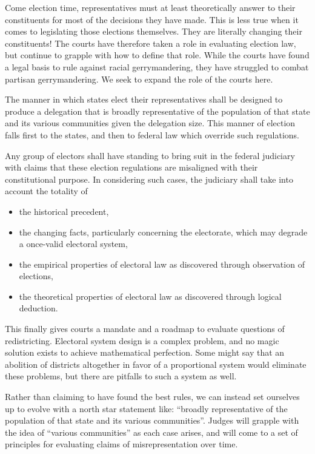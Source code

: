 \documentclass{article}
\newcommand{\quotes}[1]{``#1''}
\begin{document}
Come election time, representatives must at least theoretically answer to their constituents for most of the decisions they have made. This is less true when it comes to legislating those elections themselves. They are literally changing their constituents! The courts have therefore taken a role in evaluating election law, but continue to grapple with how to define that role. While the courts have found a legal basis to rule against racial gerrymandering, they have struggled to combat partisan gerrymandering\cite{Brewer}. We seek to expand the role of the courts here.

\begin{quoting}
The manner in which states elect their representatives shall be designed to produce a delegation that is broadly representative of the population of that state and its various communities given the delegation size. This manner of election falls first to the states, and then to federal law which override such regulations.

Any group of electors shall have standing to bring suit in the federal judiciary with claims that these election regulations are misaligned with their constitutional purpose. In considering such cases, the judiciary shall take into account the totality of
\begin{itemize}
\item the historical precedent,
\item the changing facts, particularly concerning the electorate, which may degrade a once-valid electoral system,
\item the empirical properties of electoral law as discovered through observation of elections,
\item the theoretical properties of electoral law as discovered through logical deduction.
\end{itemize}
\end{quoting}

This finally gives courts a mandate and a roadmap to evaluate questions of redistricting. Electoral system design is a complex problem, and no magic solution exists to achieve mathematical perfection. Some might say that an abolition of districts altogether in favor of a proportional system would eliminate these problems, but there are pitfalls to such a system as well.

Rather than claiming to have found the best rules, we can instead set ourselves up to evolve with a north star statement like: \quotes{broadly representative of the population of that state and its various communities}. Judges will grapple with the idea of \quotes{various communities} as each case arises, and will come to a set of principles for evaluating claims of misrepresentation over time.
\end{document}
